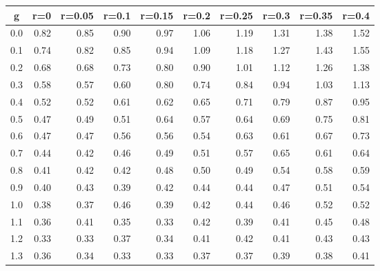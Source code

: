 %
\begin{table}[!tbp]
 \begin{center}
 \begin{tabular}{rrrrrrrrrr}\hline\hline
\multicolumn{1}{c}{g}&\multicolumn{1}{c}{r=0}&\multicolumn{1}{c}{r=0.05}&\multicolumn{1}{c}{r=0.1}&\multicolumn{1}{c}{r=0.15}&\multicolumn{1}{c}{r=0.2}&\multicolumn{1}{c}{r=0.25}&\multicolumn{1}{c}{r=0.3}&\multicolumn{1}{c}{r=0.35}&\multicolumn{1}{c}{r=0.4}\tabularnewline
\hline
0.0&0.82&0.85&0.90&0.97&1.06&1.19&1.31&1.38&1.52\tabularnewline
0.1&0.74&0.82&0.85&0.94&1.09&1.18&1.27&1.43&1.55\tabularnewline
0.2&0.68&0.68&0.73&0.80&0.90&1.01&1.12&1.26&1.38\tabularnewline
0.3&0.58&0.57&0.60&0.80&0.74&0.84&0.94&1.03&1.13\tabularnewline
0.4&0.52&0.52&0.61&0.62&0.65&0.71&0.79&0.87&0.95\tabularnewline
0.5&0.47&0.49&0.51&0.64&0.57&0.64&0.69&0.75&0.81\tabularnewline
0.6&0.47&0.47&0.56&0.56&0.54&0.63&0.61&0.67&0.73\tabularnewline
0.7&0.44&0.42&0.46&0.49&0.51&0.57&0.65&0.61&0.64\tabularnewline
0.8&0.41&0.42&0.42&0.48&0.50&0.49&0.54&0.58&0.59\tabularnewline
0.9&0.40&0.43&0.39&0.42&0.44&0.44&0.47&0.51&0.54\tabularnewline
1.0&0.38&0.37&0.46&0.39&0.42&0.44&0.46&0.52&0.52\tabularnewline
1.1&0.36&0.41&0.35&0.33&0.42&0.39&0.41&0.45&0.48\tabularnewline
1.2&0.33&0.33&0.37&0.34&0.41&0.42&0.41&0.43&0.43\tabularnewline
1.3&0.36&0.34&0.33&0.33&0.37&0.37&0.39&0.38&0.41\tabularnewline
\hline
\end{tabular}

\end{center}

\end{table}

